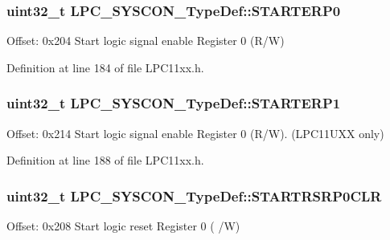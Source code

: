 \subsubsection[{\texorpdfstring{S\+T\+A\+R\+T\+E\+R\+P0}{STARTERP0}}]{ uint32\+\_\+t L\+P\+C\+\_\+\+S\+Y\+S\+C\+O\+N\+\_\+\+Type\+Def\+::\+S\+T\+A\+R\+T\+E\+R\+P0}\hypertarget{group___l_p_c11xx___definitions_ga96a994387b964d63f90460bb4d473c19}{}\label{group___l_p_c11xx___definitions_ga96a994387b964d63f90460bb4d473c19}
Offset\+: 0x204 Start logic signal enable Register 0 (R/W) 

Definition at line 184 of file L\+P\+C11xx.\+h.

\subsubsection[{\texorpdfstring{S\+T\+A\+R\+T\+E\+R\+P1}{STARTERP1}}]{ uint32\+\_\+t L\+P\+C\+\_\+\+S\+Y\+S\+C\+O\+N\+\_\+\+Type\+Def\+::\+S\+T\+A\+R\+T\+E\+R\+P1}\hypertarget{group___l_p_c11xx___definitions_ga5965d7fdc0339537cc797fa8251f57d4}{}\label{group___l_p_c11xx___definitions_ga5965d7fdc0339537cc797fa8251f57d4}
Offset\+: 0x214 Start logic signal enable Register 0 (R/W). (L\+P\+C11\+U\+XX only) 

Definition at line 188 of file L\+P\+C11xx.\+h.

\subsubsection[{\texorpdfstring{S\+T\+A\+R\+T\+R\+S\+R\+P0\+C\+LR}{STARTRSRP0CLR}}]{ uint32\+\_\+t L\+P\+C\+\_\+\+S\+Y\+S\+C\+O\+N\+\_\+\+Type\+Def\+::\+S\+T\+A\+R\+T\+R\+S\+R\+P0\+C\+LR}\hypertarget{group___l_p_c11xx___definitions_gaca777f145324363be79ee75267222aa4}{}\label{group___l_p_c11xx___definitions_gaca777f145324363be79ee75267222aa4}
Offset\+: 0x208 Start logic reset Register 0 ( /W) 

